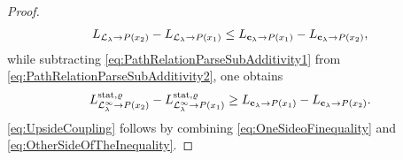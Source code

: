 \documentclass[12pt,a4paper]{article}
\numberwithin{equation}{section}
\begin{document}
\begin{proof}
\begin{align}\label{eq:OneSideoFinequality}
L_{{\cal L}_{\lambda}\to P(x_2)}-L_{{\cal L}_{\lambda}\to P(x_1)}\leq L_{\mathbf{c}_{\lambda}\to P(x_1)}-L_{\mathbf{c}_{\lambda}\to P(x_2)},
\end{align}
while subtracting \eqref{eq:PathRelationParseSubAdditivity1} from \eqref{eq:PathRelationParseSubAdditivity2}, one obtains
\begin{align}\label{eq:OtherSideOfTheInequality}
L^{{\rm stat},\varrho}_{{\cal L}_{\lambda}^\infty\to P(x_2)}-L^{{\rm stat},\varrho}_{{\cal L}_{\lambda}^\infty\to P(x_1)}\geq L_{\mathbf{c}_{\lambda}\to P(x_1)}-L_{\mathbf{c}_{\lambda}\to P(x_2)}.
\end{align}
\eqref{eq:UpsideCoupling} follows by combining \eqref{eq:OneSideoFinequality} and \eqref{eq:OtherSideOfTheInequality}.
\end{proof}
\end{document}
